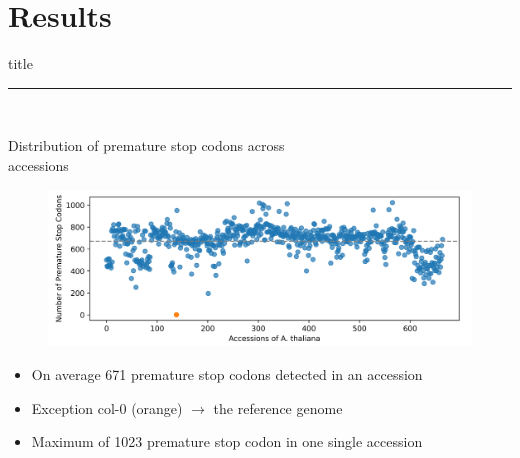 \documentclass{beamer}
\begin{document}
\section{Results}
\begin{frame}[plain]
    \vfill
    \centering
    \begin{beamercolorbox}[sep=8pt,center,shadow=true,rounded=true]{title}
      \insertsectionhead\par%
      \noindent\rule{10cm}{1pt} \\
    \end{beamercolorbox}
    \vfill
\end{frame}
\begin{frame}{Distribution of premature stop codons across \\ accessions}
	\begin{figure}[tb]
		\centering
		\begin{minipage}[h]{1\textwidth}
		\centering
		\includegraphics[width=1\textwidth]{images/Distribution_Premature_Stop_CodonsI.png}
		\label{fig:Distribution_Premature_Stop_CodonsI}
		\end{minipage}
	\end{figure}
	\begin{itemize}
		\item On average 671 premature stop codons detected in an accession
		\item Exception col-0 (orange) $\rightarrow$ the reference genome 
		\item Maximum of 1023 premature stop codon in one single accession
	\end{itemize}
\end{frame}
\end{document}
